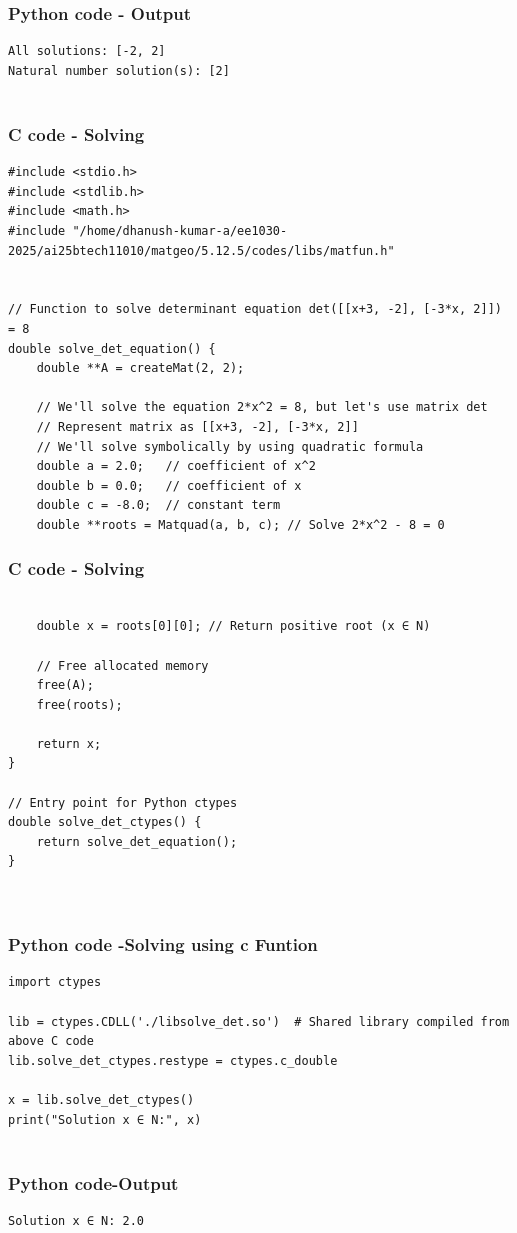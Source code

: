 \documentclass{beamer}
\begin{document}
\begin{frame}[fragile]                            
\frametitle{Python code - Output }                
\begin{lstlisting}
All solutions: [-2, 2]
Natural number solution(s): [2]


\end{lstlisting}

\end{frame}
\begin{frame}[fragile]                            
\frametitle{C code - Solving}
	\begin{lstlisting}
#include <stdio.h>
#include <stdlib.h>
#include <math.h>
#include "/home/dhanush-kumar-a/ee1030-2025/ai25btech11010/matgeo/5.12.5/codes/libs/matfun.h"


// Function to solve determinant equation det([[x+3, -2], [-3*x, 2]]) = 8
double solve_det_equation() {
    double **A = createMat(2, 2);

    // We'll solve the equation 2*x^2 = 8, but let's use matrix det
    // Represent matrix as [[x+3, -2], [-3*x, 2]]
    // We'll solve symbolically by using quadratic formula
    double a = 2.0;   // coefficient of x^2
    double b = 0.0;   // coefficient of x
    double c = -8.0;  // constant term
    double **roots = Matquad(a, b, c); // Solve 2*x^2 - 8 = 0
\end{lstlisting}

\end{frame}
\begin{frame}[fragile]                            
\frametitle{C code - Solving}
	\begin{lstlisting}

    double x = roots[0][0]; // Return positive root (x ∈ N)
    
    // Free allocated memory
    free(A);
    free(roots);

    return x;
}

// Entry point for Python ctypes
double solve_det_ctypes() {
    return solve_det_equation();
}



\end{lstlisting}
\end{frame}

	
\begin{frame}[fragile]                              
	\frametitle{Python code -Solving using c Funtion} 
	\begin{lstlisting}
import ctypes

lib = ctypes.CDLL('./libsolve_det.so')  # Shared library compiled from above C code
lib.solve_det_ctypes.restype = ctypes.c_double

x = lib.solve_det_ctypes()
print("Solution x ∈ N:", x)


\end{lstlisting}
\end{frame}

	
\begin{frame}[fragile]                              
	\frametitle{Python code-Output} 
	\begin{lstlisting}
Solution x ∈ N: 2.0

\end{lstlisting}                               
\end{frame}


	
\end{document}
